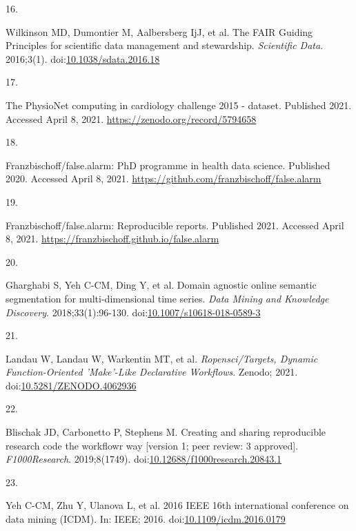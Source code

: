 \documentclass[12pt,twoside]{reedthesis}
\newlength{\csllabelwidth}
\newlength{\cslhangindent}
\newenvironment{CSLReferences}[2] %
 {%
  \setlength{\parindent}{0pt}
  \ifodd #1 \everypar{\setlength{\hangindent}{\cslhangindent}}\ignorespaces\fi
  \ifnum #2 > 0
  \setlength{\parskip}{#2\baselineskip}
  \fi
 }%
 {}
\newcommand{\CSLLeftMargin}[1]{\parbox[t]{\csllabelwidth}{#1}}
\newcommand{\CSLRightInline}[1]{\parbox[t]{\linewidth - \csllabelwidth}{#1}}
\begin{document}
\begin{CSLReferences}{0}{0}
\leavevmode{}%
\CSLLeftMargin{16. }
\CSLRightInline{Wilkinson MD, Dumontier M, Aalbersberg IjJ, et al. The FAIR Guiding Principles for scientific data management and stewardship. \emph{Scientific Data}. 2016;3(1). doi:\href{https://doi.org/10.1038/sdata.2016.18}{10.1038/sdata.2016.18}}

\leavevmode{}%
\CSLLeftMargin{17. }
\CSLRightInline{The PhysioNet computing in cardiology challenge 2015 - dataset. Published 2021. Accessed April 8, 2021. \url{https://zenodo.org/record/5794658}}

\leavevmode{}%
\CSLLeftMargin{18. }
\CSLRightInline{Franzbischoff/false.alarm: PhD programme in health data science. Published 2020. Accessed April 8, 2021. \url{https://github.com/franzbischoff/false.alarm}}

\leavevmode{}%
\CSLLeftMargin{19. }
\CSLRightInline{Franzbischoff/false.alarm: Reproducible reports. Published 2021. Accessed April 8, 2021. \url{https://franzbischoff.github.io/false.alarm}}

\leavevmode{}%
\CSLLeftMargin{20. }
\CSLRightInline{Gharghabi S, Yeh C-CM, Ding Y, et al. Domain agnostic online semantic segmentation for multi-dimensional time series. \emph{Data Mining and Knowledge Discovery}. 2018;33(1):96-130. doi:\href{https://doi.org/10.1007/s10618-018-0589-3}{10.1007/s10618-018-0589-3}}

\leavevmode{}%
\CSLLeftMargin{21. }
\CSLRightInline{Landau W, Landau W, Warkentin MT, et al. \emph{Ropensci/Targets, Dynamic Function-Oriented 'Make'-Like Declarative Workflows}. Zenodo; 2021. doi:\href{https://doi.org/10.5281/ZENODO.4062936}{10.5281/ZENODO.4062936}}

\leavevmode{}%
\CSLLeftMargin{22. }
\CSLRightInline{Blischak JD, Carbonetto P, Stephens M. Creating and sharing reproducible research code the workflowr way {[}version 1; peer review: 3 approved{]}. \emph{F1000Research}. 2019;8(1749). doi:\href{https://doi.org/10.12688/f1000research.20843.1}{10.12688/f1000research.20843.1}}

\leavevmode{}%
\CSLLeftMargin{23. }
\CSLRightInline{Yeh C-CM, Zhu Y, Ulanova L, et al. 2016 IEEE 16th international conference on data mining (ICDM). In: IEEE; 2016. doi:\href{https://doi.org/10.1109/icdm.2016.0179}{10.1109/icdm.2016.0179}}


\end{CSLReferences}
\end{document}
